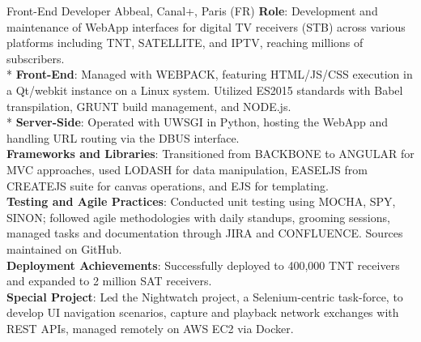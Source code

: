 \documentclass[
  a4paper,
   maincolor=cvblue,
   sectioncolor=cvblue,
]{fortysecondscv}
\begin{document}
\begin{cvtable}
    {Front-End Developer}
    {Abbeal, Canal+,  Paris (FR)}
    {
      \textbf{Role}: Development and maintenance of WebApp interfaces for digital TV receivers (STB) across various platforms including TNT, SATELLITE, and IPTV, reaching millions of subscribers.\\
      * \textbf{Front-End}: Managed with WEBPACK, featuring HTML/JS/CSS execution in a Qt/webkit instance on a Linux system. Utilized ES2015 standards with Babel transpilation, GRUNT build management, and NODE.js.\\
      * \textbf{Server-Side}: Operated with UWSGI in Python, hosting the WebApp and handling URL routing via the DBUS interface.\\
      \textbf{Frameworks and Libraries}: Transitioned from BACKBONE to ANGULAR for MVC approaches, used LODASH for data manipulation, EASELJS from CREATEJS suite for canvas operations, and EJS for templating.\\
      \textbf{Testing and Agile Practices}: Conducted unit testing using MOCHA, SPY, SINON; followed agile methodologies with daily standups, grooming sessions, managed tasks and documentation through JIRA and CONFLUENCE. Sources maintained on GitHub.\\
      \textbf{Deployment Achievements}: Successfully deployed to 400,000 TNT receivers and expanded to 2 million SAT receivers.\\
      \textbf{Special Project}: Led the Nightwatch project, a Selenium-centric task-force, to develop UI navigation scenarios, capture and playback network exchanges with REST APIs, managed remotely on AWS EC2 via Docker.\\
    }
\end{cvtable}
\end{document}
